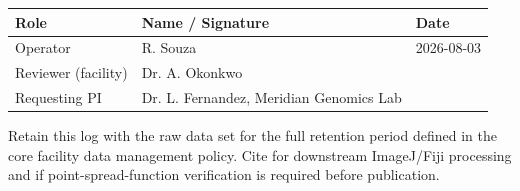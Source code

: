 \begin{center}
\renewcommand{\arraystretch}{1.8}
\begin{tabular}{@{}p{3.6cm} p{4.4cm} p{4.4cm}@{}}
\toprule
\rowcolor{inkslate}
\textcolor{paperwhite}{\textbf{Role}} & \textcolor{paperwhite}{\textbf{Name / Signature}} & \textcolor{paperwhite}{\textbf{Date}} \\
\midrule
Operator & R. Souza & 2026-08-03 \\
\rowcolor{mistgray}
Reviewer (facility) & Dr. A. Okonkwo & \\
Requesting PI & Dr. L. Fernandez, Meridian Genomics Lab & \\
\bottomrule
\end{tabular}
\end{center}

\vfill
\begin{center}
{\footnotesize\color{fluorgray} Retain this log with the raw data set for the
full retention period defined in the core facility data management policy.
Cite \citet{schneider2012} for downstream ImageJ/Fiji processing and
\citet{cole2011} if point-spread-function verification is required before
publication.}
\end{center}
